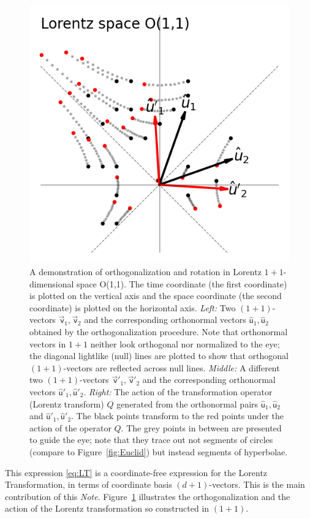 \documentclass{article}
\newcommand\upvec[1]{\!\vec{\,\mathrm{#1}}}
\newcommand{\Lvec}[1]{\upvec{\mathsf{#1}}} %
\newcommand{\Lhat}[1]{\hat{\mathsf{#1}}} %
\newcommand{\plus}{\!+\!} %
\newcommand{\documentname}{\textsl{Note}}
\newcommand{\figref}[1]{Figure~\ref{#1}}
\newlength{\figurewidth}
\begin{document}
\begin{figure}[t]
\begin{mdframed}
\includegraphics[width=\figurewidth]{L_Q.png}
\caption{A demonstration of orthogonalization and rotation in Lorentz $1\plus1$-dimensional space O(1,1).
The time coordinate (the first coordinate) is plotted on the vertical axis and the space coordinate (the second coordinate) is plotted on the horizontal axis.
\textsl{Left:} Two $(1\plus1)$-vectors $\Lvec{v}_1, \Lvec{v}_2$ and the corresponding orthonormal vectors $\Lhat{u}_1, \Lhat{u}_2$ obtained by the orthogonalization procedure.
Note that orthonormal vectors in $1\plus1$ neither look orthogonal nor normalized to the eye; the diagonal lightlike (null) lines are plotted to show that orthogonal $(1\plus1)$-vectors are reflected across null lines.
\textsl{Middle:} A different two $(1\plus1)$-vectors $\Lvec{v}'_1, \Lvec{v}'_2$ and the corresponding orthonormal vectors $\Lhat{u}'_1, \Lhat{u}'_2$.
\textsl{Right:} The action of the transformation operator (Lorentz transform) $Q$ generated from the orthonormal pairs $\Lhat{u}_1, \Lhat{u}_2$ and $\Lhat{u}'_1, \Lhat{u}'_2$.
The black points transform to the red points under the action of the operator $Q$.
The grey points in between are presented to guide the eye; 
note that they trace out not segments of circles (compare to \figref{fig:Euclid}) but instead segments of hyperbolae.\label{fig:Lorentz}}
\end{mdframed}
\end{figure}
This expression \eqref{eq:LT} is a coordinate-free expression for the Lorentz Transformation, in terms of coordinate basis $(d\plus1)$-vectors.
This is the main contribution of this \documentname.
\figref{fig:Lorentz} illustrates the orthogonalization and the action of the Lorentz transformation so constructed in $(1\plus1)$.
\end{document}
